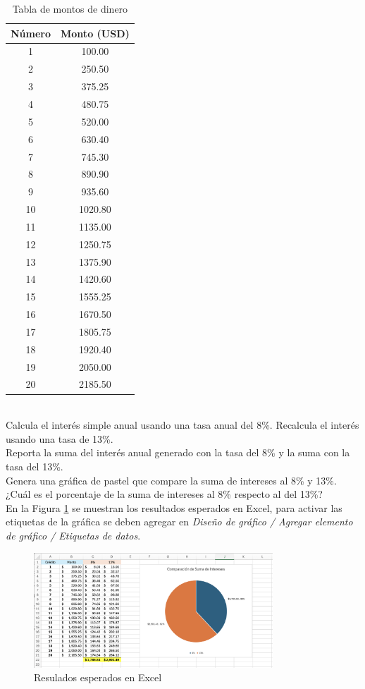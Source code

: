 \documentclass{article}
\begin{document}
\begin{table}[h!]
\centering
\begin{tabular}{|c|c|}
\hline
\textbf{Número} & \textbf{Monto (USD)} \\ \hline
1  & 100.00   \\ \hline
2  & 250.50   \\ \hline
3  & 375.25   \\ \hline
4  & 480.75   \\ \hline
5  & 520.00   \\ \hline
6  & 630.40   \\ \hline
7  & 745.30   \\ \hline
8  & 890.90   \\ \hline
9  & 935.60   \\ \hline
10 & 1020.80  \\ \hline
11 & 1135.00  \\ \hline
12 & 1250.75  \\ \hline
13 & 1375.90  \\ \hline
14 & 1420.60  \\ \hline
15 & 1555.25  \\ \hline
16 & 1670.50  \\ \hline
17 & 1805.75  \\ \hline
18 & 1920.40  \\ \hline
19 & 2050.00  \\ \hline
20 & 2185.50  \\ \hline
\end{tabular}
\caption{Tabla de montos de dinero}
\label{tab:montos_dinero}
\end{table}
\hfill\\
Calcula el interés simple anual usando una tasa anual del 8\%. Recalcula el interés usando una tasa de 13\%.
\\[12pt]
Reporta la suma del interés anual generado con la tasa del 8\% y la suma con la tasa del 13\%.
\\[12pt]
Genera una gráfica de pastel que compare la suma de intereses al 8\% y 13\%. ¿Cuál es el porcentaje de la suma de intereses al 8\% respecto al del 13\%?
\\[12pt]
En la Figura \ref{fig:p501a} se muestran los resultados esperados en Excel, para activar las etiquetas de la gráfica se deben agregar en \textit{Diseño de gráfico / Agregar elemento de gráfico / Etiquetas de datos}.
\\[12pt]
\begin{figure}[h]
    \centering
    \includegraphics[width=0.8\textwidth]{figures/p501a.png}
    \captionsetup{width=\textwidth}
    \caption{Resulados esperados en Excel}
    \label{fig:p501a}
\end{figure}
\end{document}
